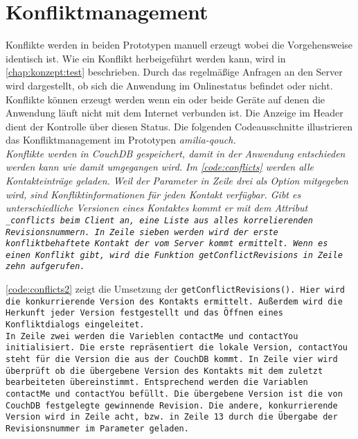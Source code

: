 \section{Konfliktmanagement}
Konflikte werden in beiden Prototypen manuell erzeugt wobei die Vorgehensweise identisch ist.
Wie ein Konflikt herbeigeführt werden kann, wird in \autoref{chap:konzept:test} beschrieben.
Durch das regelmäßige Anfragen an den Server wird dargestellt, ob sich die Anwendung im Onlinestatus befindet oder nicht.
Konflikte können erzeugt werden wenn ein oder beide Geräte auf denen die Anwendung läuft nicht mit dem Internet verbunden ist. Die Anzeige im Header dient der Kontrolle über diesen Status.
Die folgenden Codeausschnitte illustrieren das Konfliktmanagement im Prototypen \it{amilia-qouch}.\\
Konflikte werden in CouchDB gespeichert, damit in der Anwendung entschieden werden kann wie damit umgegangen wird.
Im \autoref{code:conflicts} werden alle Kontakteinträge geladen.
Weil der Parameter in Zeile drei als Option mitgegeben wird, sind Konfliktinformationen für jeden Kontakt verfügbar.
Gibt es unterschiedliche Versionen eines Kontaktes kommt er mit dem Attribut \tt{\_conflicts} beim Client an, eine Liste aus alles korrelierenden Revisionsnummern.
In Zeile sieben werden wird der erste konfliktbehaftete Kontakt der vom Server kommt ermittelt. Wenn es einen Konflikt gibt, wird die Funktion \tt{getConflictRevisions} in Zeile zehn aufgerufen.
%
\begin{center}
  
\end{center}
%
\autoref{code:conflicts2} zeigt die Umsetzung der \tt{getConflictRevisions()}.
Hier wird die konkurrierende Version des Kontakts ermittelt. Außerdem wird die Herkunft jeder Version festgestellt und das Öffnen eines Konfliktdialogs eingeleitet.\\
In Zeile zwei werden die Varieblen \tt{contactMe} und \tt{contactYou} initialisiert. Die erste repräsentiert die lokale Version, \tt{contactYou} steht für die Version die aus der CouchDB kommt.
In Zeile vier wird überprüft ob die übergebene Version des Kontakts mit dem zuletzt bearbeiteten übereinstimmt. Entsprechend werden die Variablen \tt{contactMe} und \tt{contactYou} befüllt.
Die übergebene Version ist die von CouchDB festgelegte gewinnende Revision.
Die andere, konkurrierende Version wird in Zeile acht, bzw. in Zeile 13 durch die Übergabe der Revisionsnummer im Parameter geladen.
